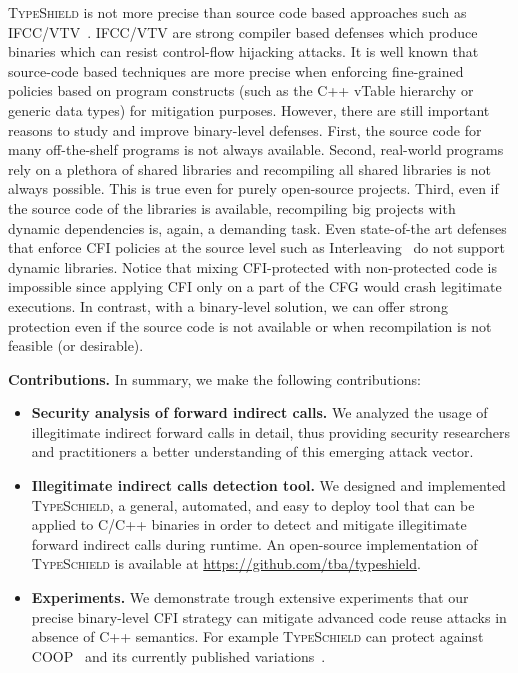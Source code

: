\textsc{TypeShield} is not more precise than source code based
approaches such as IFCC/VTV~\cite{vtv:tice}.
IFCC/VTV are strong compiler based defenses which produce binaries which can resist control-flow
hijacking attacks. It is well known that source-code based techniques are more precise 
when enforcing fine-grained policies based on program constructs (such as
the C++ vTable hierarchy or generic data types) for mitigation
purposes. However, there are still important reasons to study
and improve binary-level defenses. First, the source code
for many off-the-shelf programs is not always available.
Second, real-world programs rely on a plethora of shared
libraries and recompiling all shared libraries is not always
possible. This is true even for purely open-source projects.
Third, even if the source code of the libraries is
available, recompiling big projects with dynamic dependencies is, 
again, a demanding task. Even state-of-the art
defenses that enforce CFI policies at the source level such
as Interleaving~\cite{bounov:interleaving} do not support dynamic libraries.
Notice that mixing CFI-protected with non-protected code is impossible since
applying CFI only on a part of the CFG would crash legitimate executions.
In contrast, with a binary-level solution, we
can offer strong protection even if the source code is not
available or when recompilation is not feasible (or desirable).

\textbf{Contributions.} In summary, we make the following contributions:
\label{Contribution}
\begin{itemize}
 \item \textbf{Security analysis of forward indirect calls.} 
 We analyzed the usage of illegitimate indirect forward calls in detail,
 thus providing security researchers and
practitioners a better understanding of this emerging
attack vector.

 \item \textbf{Illegitimate indirect calls detection tool.}
 We designed and implemented \textsc{TypeSchield}, a general, automated, and easy to deploy tool
 that can be applied to C/C++ binaries in order to detect and mitigate illegitimate forward indirect calls 
 during runtime. An open-source implementation of \textsc{TypeSchield} is available at \url{https://github.com/tba/typeshield}.
 
 \item \textbf{Experiments.} We demonstrate trough extensive experiments that our precise
 binary-level CFI strategy can mitigate advanced code reuse attacks in absence of C++ semantics.
 For example \textsc{TypeSchield} can protect against COOP~\cite{schuster:coop} and its currently published 
 variations~\cite{ctf:coop, crane:readactor++, loop:oriented, subversive-c:lettner}.
  
\end{itemize}

